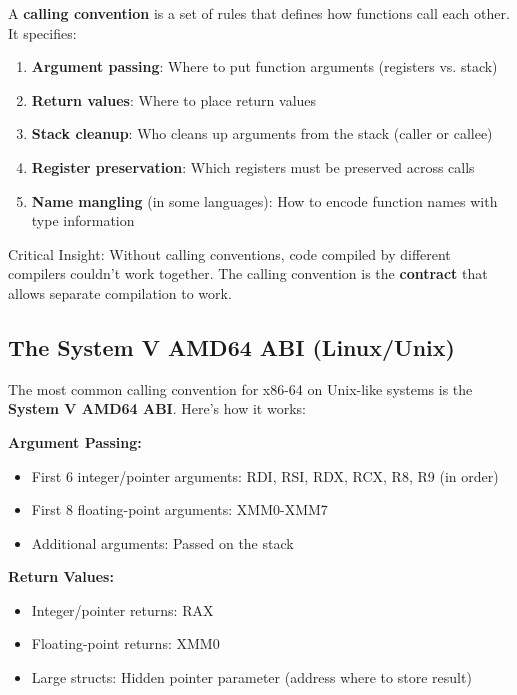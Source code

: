 A \textbf{calling convention} is a set of rules that defines how functions call each other. It specifies:

\begin{enumerate}
  \item \textbf{Argument passing}: Where to put function arguments (registers vs. stack)
  \item \textbf{Return values}: Where to place return values
  \item \textbf{Stack cleanup}: Who cleans up arguments from the stack (caller or callee)
  \item \textbf{Register preservation}: Which registers must be preserved across calls
  \item \textbf{Name mangling} (in some languages): How to encode function names with type information
\end{enumerate}

\begin{definition}
  Critical Insight: Without calling conventions, code compiled by different compilers couldn't work together. The calling convention is the \textbf{contract} that allows separate compilation to work.
\end{definition}

\subsection{The System V AMD64 ABI (Linux/Unix)}

The most common calling convention for x86-64 on Unix-like systems is the \textbf{System V AMD64 ABI}. Here's how it works:

\textbf{Argument Passing:}
\begin{itemize}
  \item First 6 integer/pointer arguments: RDI, RSI, RDX, RCX, R8, R9 (in order)
  \item First 8 floating-point arguments: XMM0-XMM7
  \item Additional arguments: Passed on the stack
\end{itemize}

\textbf{Return Values:}
\begin{itemize}
  \item Integer/pointer returns: RAX
  \item Floating-point returns: XMM0
  \item Large structs: Hidden pointer parameter (address where to store result)
\end{itemize}

